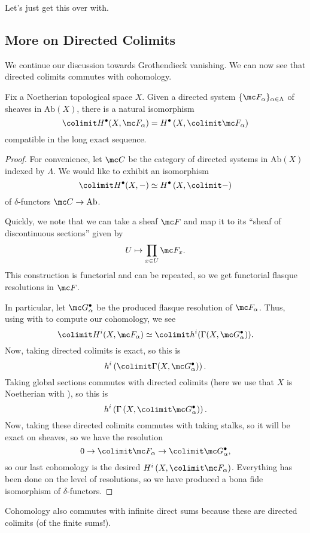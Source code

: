 \documentclass[../notes.tex]{subfiles}
\begin{document}
Let's just get this over with.

\subsection{More on Directed Colimits}
We continue our discussion towards Grothendieck vanishing. We can now see that directed colimits commutes with cohomology.
\begin{proposition} \label{prop:cohomology-directed-colimit}
	Fix a Noetherian topological space $X$. Given a directed system $\{\mc F_\alpha\}_{\alpha\in\Lambda}$ of sheaves in $\mathrm{Ab}(X)$, there is a natural isomorphism
	\[\colimit H^\bullet(X,\mc F_\alpha)=H^\bullet\left(X,\colimit\mc F_\alpha\right)\]
	compatible in the long exact sequence.
\end{proposition}
\begin{proof}
	For convenience, let $\mc C$ be the category of directed systems in $\mathrm{Ab}(X)$ indexed by $\Lambda$. We would like to exhibit an isomorphism
	\[\colimit H^\bullet(X,-)\simeq H^\bullet\left(X,\colimit-\right)\]
	of $\delta$-functors $\mc C\to\mathrm{Ab}$.

	Quickly, we note that we can take a sheaf $\mc F$ and map it to its ``sheaf of discontinuous sections'' given by
	\[U\mapsto\prod_{x\in U}\mc F_x.\]
	This construction is functorial and can be repeated, so we get functorial flasque resolutions in $\mc F$.

	In particular, let $\mc G^\bullet_\alpha$ be the produced flasque resolution of $\mc F_\alpha$. Thus, using  with  to compute our cohomology, we see
	\[\colimit H^i(X,\mc F_\alpha)\simeq\colimit h^i(\Gamma(X,\mc G^\bullet_\alpha)).\]
	Now, taking directed colimits is exact, so this is
	\[h^i\left(\colimit\Gamma(X,\mc G_\alpha^\bullet)\right).\]
	Taking global sections commutes with directed colimits (here we use that $X$ is Noetherian with \cite[Exercise~1.11]{hartshorne}), so this is
	\[h^i\left(\Gamma\left(X,\colimit\mc G_\alpha^\bullet\right)\right).\]
	Now, taking these directed colimits commutes with taking stalks, so it will be exact on sheaves, so we have the resolution
	\[0\to\colimit\mc F_\alpha\to\colimit\mc G_\alpha^\bullet,\]
	so our last cohomology is the desired $H^i\left(X,\colimit\mc F_\alpha\right)$. Everything has been done on the level of resolutions, so we have produced a bona fide isomorphism of $\delta$-functors.
\end{proof}
\begin{example}
	Cohomology also commutes with infinite direct sums because these are directed colimits (of the finite sums!).
\end{example}
\end{document}
